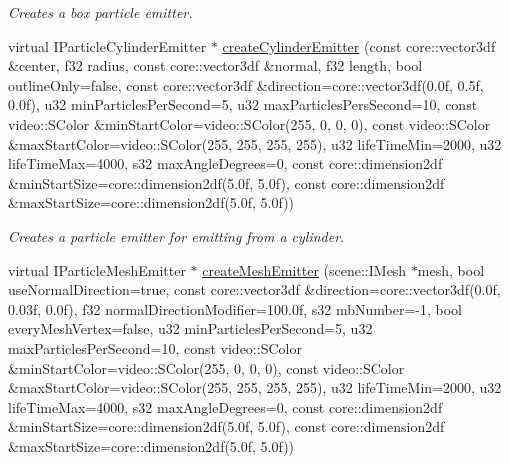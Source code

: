 \begin{DoxyCompactItemize}
\begin{DoxyCompactList}\small\item\em Creates a box particle emitter. \end{DoxyCompactList}\item 
\hypertarget{classirr_1_1scene_1_1_c_particle_system_scene_node_aa8887b38e603216152bd31bd19affadb}{virtual I\-Particle\-Cylinder\-Emitter $\ast$ \hyperlink{classirr_1_1scene_1_1_c_particle_system_scene_node_aa8887b38e603216152bd31bd19affadb}{create\-Cylinder\-Emitter} (const core\-::vector3df \&center, f32 radius, const core\-::vector3df \&normal, f32 length, bool outline\-Only=false, const core\-::vector3df \&direction=core\-::vector3df(0.\-0f, 0.\-5f, 0.\-0f), u32 min\-Particles\-Per\-Second=5, u32 max\-Particles\-Pers\-Second=10, const video\-::\-S\-Color \&min\-Start\-Color=video\-::\-S\-Color(255, 0, 0, 0), const video\-::\-S\-Color \&max\-Start\-Color=video\-::\-S\-Color(255, 255, 255, 255), u32 life\-Time\-Min=2000, u32 life\-Time\-Max=4000, s32 max\-Angle\-Degrees=0, const core\-::dimension2df \&min\-Start\-Size=core\-::dimension2df(5.\-0f, 5.\-0f), const core\-::dimension2df \&max\-Start\-Size=core\-::dimension2df(5.\-0f, 5.\-0f))}\label{classirr_1_1scene_1_1_c_particle_system_scene_node_aa8887b38e603216152bd31bd19affadb}

\begin{DoxyCompactList}\small\item\em Creates a particle emitter for emitting from a cylinder. \end{DoxyCompactList}\item 
\hypertarget{classirr_1_1scene_1_1_c_particle_system_scene_node_a55545d6e2185c5f2c04247256ccf6b30}{virtual I\-Particle\-Mesh\-Emitter $\ast$ \hyperlink{classirr_1_1scene_1_1_c_particle_system_scene_node_a55545d6e2185c5f2c04247256ccf6b30}{create\-Mesh\-Emitter} (scene\-::\-I\-Mesh $\ast$mesh, bool use\-Normal\-Direction=true, const core\-::vector3df \&direction=core\-::vector3df(0.\-0f, 0.\-03f, 0.\-0f), f32 normal\-Direction\-Modifier=100.\-0f, s32 mb\-Number=-\/1, bool every\-Mesh\-Vertex=false, u32 min\-Particles\-Per\-Second=5, u32 max\-Particles\-Per\-Second=10, const video\-::\-S\-Color \&min\-Start\-Color=video\-::\-S\-Color(255, 0, 0, 0), const video\-::\-S\-Color \&max\-Start\-Color=video\-::\-S\-Color(255, 255, 255, 255), u32 life\-Time\-Min=2000, u32 life\-Time\-Max=4000, s32 max\-Angle\-Degrees=0, const core\-::dimension2df \&min\-Start\-Size=core\-::dimension2df(5.\-0f, 5.\-0f), const core\-::dimension2df \&max\-Start\-Size=core\-::dimension2df(5.\-0f, 5.\-0f))}\label{classirr_1_1scene_1_1_c_particle_system_scene_node_a55545d6e2185c5f2c04247256ccf6b30}


\end{DoxyCompactItemize}
